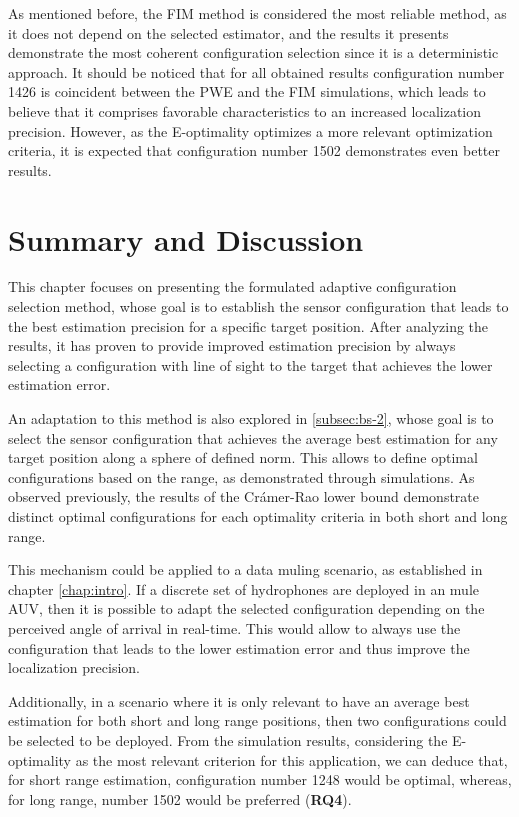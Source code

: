 As mentioned before, the FIM method is considered the most reliable method, as it does not depend on the selected estimator, and the results it presents demonstrate the most coherent configuration selection since it is a deterministic approach.
It should be noticed that for all obtained results configuration number 1426 is coincident between the PWE and the FIM simulations, which leads to believe that it comprises favorable characteristics to an increased localization precision. However, as the E-optimality optimizes a more relevant optimization criteria, it is expected that configuration number 1502 demonstrates even better results. 


\section{Summary and Discussion}

This chapter focuses on presenting the formulated adaptive configuration selection method, whose goal is to establish the sensor configuration that leads to the best estimation precision for a specific target position. After analyzing the results, it has proven to provide improved estimation precision by always selecting a configuration with line of sight to the target that achieves the lower estimation error. 

An adaptation to this method is also explored in \ref{subsec:bs-2}, whose goal is to select the sensor configuration that achieves the average best estimation for any target position along a sphere of defined norm. This allows to define optimal configurations based on the range, as demonstrated through simulations. As observed previously, the results of the Crámer-Rao lower bound demonstrate distinct optimal configurations for each optimality criteria in both short and long range. 

This mechanism could be applied to a data muling scenario, as established in chapter \ref{chap:intro}. If a discrete set of hydrophones are deployed in an mule AUV, then it is possible to adapt the selected configuration depending on the perceived angle of arrival in real-time. This would allow to always use the configuration that leads to the lower estimation error and thus improve the localization precision. 

Additionally, in a scenario where it is only relevant to have an average best estimation for both short and long range positions, then two configurations could be selected to be deployed. From the simulation results, considering the E-optimality as the most relevant criterion for this application, we can deduce that, for short range estimation, configuration number 1248 would be optimal, whereas, for long range, number 1502 would be preferred (\textbf{RQ4}).

